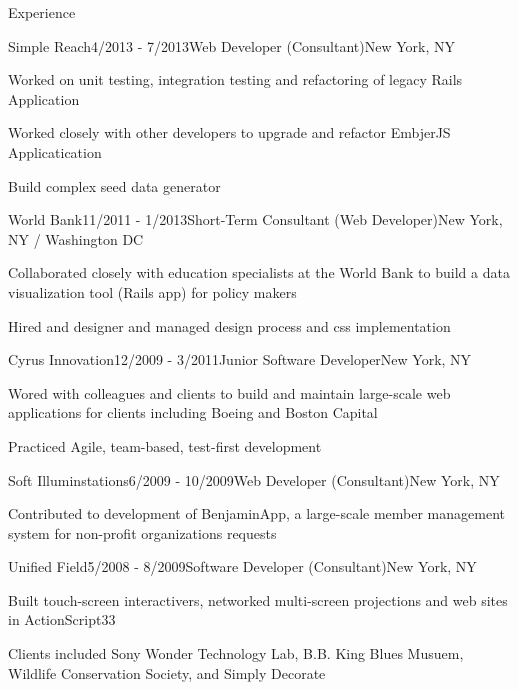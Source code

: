 \documentclass{resume} %
\begin{document}
\begin{rSection}{Experience}
\clearpage

\begin{rSubsection}{Simple Reach}{4/2013 - 7/2013}{Web Developer (Consultant)}{New York, NY}
\item Worked on unit testing, integration testing and refactoring of legacy Rails Application
\item Worked closely with other developers to upgrade and refactor EmbjerJS Applicatication
\item Build complex seed data generator
\end{rSubsection}

\begin{rSubsection}{World Bank}{11/2011 - 1/2013}{Short-Term Consultant (Web Developer)}{New York, NY / Washington DC}
\item Collaborated closely with education specialists at the World Bank to build a data visualization tool (Rails app) for policy makers
\item Hired and designer and managed design process and css implementation
\end{rSubsection}

\begin{rSubsection}{Cyrus Innovation}{12/2009 - 3/2011}{Junior Software Developer}{New York, NY}
\item Wored with colleagues and clients to build and maintain large-scale web applications for clients including Boeing and Boston Capital
\item Practiced Agile, team-based, test-first development
\end{rSubsection}

\begin{rSubsection}{Soft Illuminstations}{6/2009 - 10/2009}{Web Developer (Consultant)}{New York, NY}
\item Contributed to development of BenjaminApp, a large-scale member management system for non-profit organizations
requests
\end{rSubsection}

\begin{rSubsection}{Unified Field}{5/2008 - 8/2009}{Software Developer (Consultant)}{New York, NY}
\item Built touch-screen interactivers, networked multi-screen projections and web sites in ActionScript33
\item Clients included Sony Wonder Technology Lab, B.B. King Blues Musuem, Wildlife Conservation Society, and Simply Decorate
\end{rSubsection}


\end{rSection}
\end{document}
